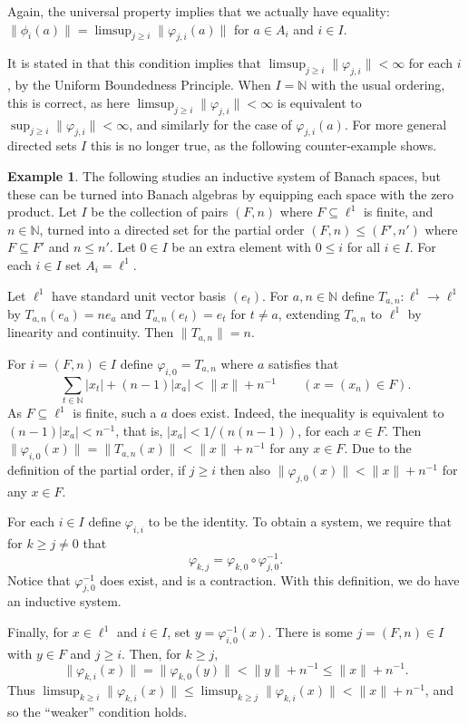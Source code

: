 \documentclass[a4paper,11pt]{article}
\theoremstyle{definition}
\newtheorem{example}[lemma]{Example}
\begin{document}
Again, the universal property implies that we actually have equality: $\|\phi_i(a)\| =
\limsup_{j\geq i} \|\varphi_{j,i}(a)\|$ for $a\in A_i$ and $i\in I$.

It is stated in \cite{blackadar, palmer} that this condition implies that  $\limsup_{j\geq i}
\|\varphi_{j,i}\| < \infty$ for each $i$, by the Uniform Boundedness Principle.  When $I=\mathbb N$
with the usual ordering, this is correct, as here $\limsup_{j\geq i} \|\varphi_{j,i}\| < \infty$
is equivalent to $\sup_{j\geq i} \|\varphi_{j,i}\| < \infty$, and similarly for the case of
$\varphi_{j,i}(a)$.  For more general directed sets $I$ this is no longer true, as the following
counter-example shows.

\begin{example}\label{ex:1}
The following studies an inductive system of Banach spaces, but these can be turned into Banach
algebras by equipping each space with the zero product.  Let $I$ be the collection of pairs
$(F,n)$ where $F\subseteq\ell^1$ is finite, and $n\in\mathbb N$, turned into a directed set for the
partial order $(F,n) \leq (F',n')$ where $F\subseteq F'$ and $n\leq n'$.  Let $0\in I$ be an extra
element with $0\leq i$ for all $i\in I$.  For each $i\in I$ set $A_i = \ell^1$.

Let $\ell^1$ have standard unit vector basis $(e_t)$.  For $a,n\in\mathbb N$ define $T_{a,n}:
\ell^1\rightarrow\ell^1$ by $T_{a,n}(e_a) = n e_a$ and $T_{a,n}(e_t) = e_t$ for $t\not=a$, extending
$T_{a,n}$ to $\ell^1$ by linearity and continuity.  Then $\|T_{a,n}\| = n$.

For $i=(F,n)\in I$ define $\varphi_{i,0} = T_{a,n}$ where $a$ satisfies that
\[ \sum_{t\in\mathbb N} |x_t| + (n-1)|x_a| < \|x\|+n^{-1} \qquad (x=(x_n) \in F). \]
As $F\subseteq \ell^1$ is finite, such a $a$ does exist.  Indeed, the inequality is equivalent to
$(n-1)|x_a| < n^{-1}$, that is, $|x_a| < 1/(n(n-1))$, for each $x\in F$.
Then $\|\varphi_{i,0}(x)\| = \|T_{a,n}(x)\| < \|x\|+n^{-1}$ for any $x\in F$.   Due to the
definition of the partial order, if $j\geq i$ then also $\|\varphi_{j,0}(x)\| < \|x\|+n^{-1}$ for
any $x\in F$.

For each $i\in I$ define $\varphi_{i,i}$ to be the identity.  To obtain a system, we require that
for $k\geq j\not=0$ that
\[ \varphi_{k,j} = \varphi_{k,0} \circ \varphi_{j,0}^{-1}. \]
Notice that $\varphi_{j,0}^{-1}$ does exist, and is a contraction.  With this definition, we do
have an inductive system.

Finally, for $x\in\ell^1$ and $i\in I$, set $y=\varphi_{i,0}^{-1}(x)$.  There is some $j=(F,n)\in I$
with $y\in F$ and $j\geq i$.  Then, for $k\geq j$,
\[ \|\varphi_{k,i}(x)\| = \|\varphi_{k,0}(y)\| < \|y\|+n^{-1} \leq \|x\| + n^{-1}. \]
Thus $\limsup_{k\geq i} \|\varphi_{k,i}(x)\| \leq \limsup_{k\geq j} \|\varphi_{k,i}(x)\|
< \|x\| + n^{-1}$, and so the ``weaker'' condition holds.


\end{example}
\end{document}
